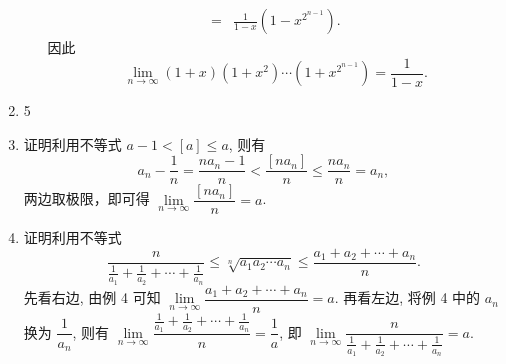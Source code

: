 \begin{enumerate}
\begin{enumerate}[(1)]
\begin{align*}
                    ={} & \frac{1}{1-x}(1 - x^{2^{n-1}}).
                \end{align*}
                因此
                \[
                    \lim\limits_{n\to\infty}(1 + x)(1 + x^2)\cdots(1 + x^{2^{n-1}}) = \frac{1}{1-x}.
                \]
        \end{enumerate}
    \item 5
    \item
        {\heiti 证明}\quad 利用不等式 $a - 1 < [a] \leqslant a$, 则有
        \begin{equation*}
            a_n - \frac 1n = \frac{na_n - 1}{n} < \frac{[na_n]}{n} \leqslant \frac{na_n}{n} = a_n,
        \end{equation*}
        两边取极限，即可得 $\lim\limits_{n\to\infty}\dfrac{[na_n]}{n} = a$.
    \item 
        {\heiti 证明}\quad 利用不等式
        \[\frac{n}{\frac{1}{a_1} + \frac{1}{a_2} + \cdots + \frac{1}{a_n}} \leqslant \sqrt[n]{a_1a_2\cdots a_n} \leqslant \frac{a_1 + a_2 + \cdots + a_n}{n}.\]
        先看右边, 由例 4 可知 $\lim\limits_{n\to\infty}\dfrac{a_1 + a_2 + \cdots + a_n}{n} = a$. 再看左边, 将例 4 中的 $a_n$ 换为 $\dfrac{1}{a_n}$, 则有 $\lim\limits_{n\to\infty}\dfrac{\frac{1}{a_1} + \frac{1}{a_2} + \cdots + \frac{1}{a_n}}{n} = \dfrac 1a$, 即 $\lim\limits_{n\to\infty}\dfrac{n}{\frac{1}{a_1} + \frac{1}{a_2} + \cdots + \frac{1}{a_n}} = a$.
    

\end{enumerate}
